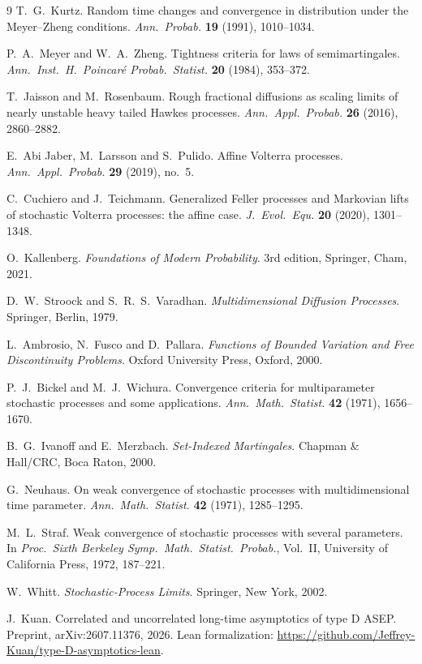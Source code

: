 \documentclass[11pt,a4paper]{article}
\theoremstyle{plain}
\theoremstyle{definition}
\theoremstyle{remark}
\begin{document}
\begin{thebibliography}{9}
T.~G.~Kurtz.
\newblock Random time changes and convergence in distribution under the
  Meyer--Zheng conditions.
\newblock \emph{Ann.\ Probab.} \textbf{19} (1991), 1010--1034.

P.~A.~Meyer and W.~A.~Zheng.
\newblock Tightness criteria for laws of semimartingales.
\newblock \emph{Ann.\ Inst.\ H.\ Poincar\'e Probab.\ Statist.} \textbf{20}
  (1984), 353--372.

T.~Jaisson and M.~Rosenbaum.
\newblock Rough fractional diffusions as scaling limits of nearly unstable heavy
  tailed Hawkes processes.
\newblock \emph{Ann.\ Appl.\ Probab.} \textbf{26} (2016), 2860--2882.

E.~Abi Jaber, M.~Larsson and S.~Pulido.
\newblock Affine Volterra processes.
\newblock \emph{Ann.\ Appl.\ Probab.} \textbf{29} (2019), no.~5.

C.~Cuchiero and J.~Teichmann.
\newblock Generalized Feller processes and Markovian lifts of stochastic
  Volterra processes: the affine case.
\newblock \emph{J.\ Evol.\ Equ.} \textbf{20} (2020), 1301--1348.

O.~Kallenberg.
\newblock \emph{Foundations of Modern Probability}.
\newblock 3rd edition, Springer, Cham, 2021.

D.~W.~Stroock and S.~R.~S.~Varadhan.
\newblock \emph{Multidimensional Diffusion Processes}.
\newblock Springer, Berlin, 1979.

L.~Ambrosio, N.~Fusco and D.~Pallara.
\newblock \emph{Functions of Bounded Variation and Free Discontinuity Problems}.
\newblock Oxford University Press, Oxford, 2000.

P.~J.~Bickel and M.~J.~Wichura.
\newblock Convergence criteria for multiparameter stochastic processes and some
  applications.
\newblock \emph{Ann.\ Math.\ Statist.} \textbf{42} (1971), 1656--1670.

B.~G.~Ivanoff and E.~Merzbach.
\newblock \emph{Set-Indexed Martingales}.
\newblock Chapman \& Hall/CRC, Boca Raton, 2000.

G.~Neuhaus.
\newblock On weak convergence of stochastic processes with multidimensional time
  parameter.
\newblock \emph{Ann.\ Math.\ Statist.} \textbf{42} (1971), 1285--1295.

M.~L.~Straf.
\newblock Weak convergence of stochastic processes with several parameters.
\newblock In \emph{Proc.\ Sixth Berkeley Symp.\ Math.\ Statist.\ Probab.},
  Vol.~II, University of California Press, 1972, 187--221.

W.~Whitt.
\newblock \emph{Stochastic-Process Limits}.
\newblock Springer, New York, 2002.

J.~Kuan.
\newblock Correlated and uncorrelated long-time asymptotics of type D ASEP.
\newblock Preprint, arXiv:2607.11376, 2026.
\newblock Lean formalization:
  \url{https://github.com/Jeffrey-Kuan/type-D-asymptotics-lean}.

\end{thebibliography}
\end{document}
